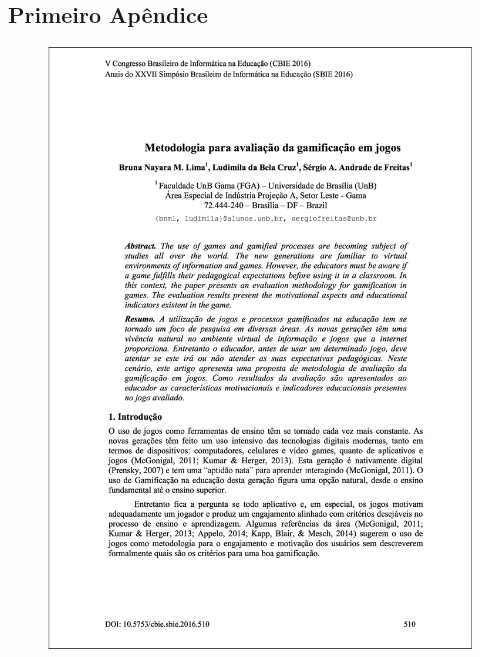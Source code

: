 \begin{apendicesenv}

\partapendices

\chapter{Primeiro Apêndice}

\begin{figure}[h]
	\centering
		\includegraphics[keepaspectratio=true,scale=0.6]{figuras/a1.png}
\end{figure}


\end{apendicesenv}
